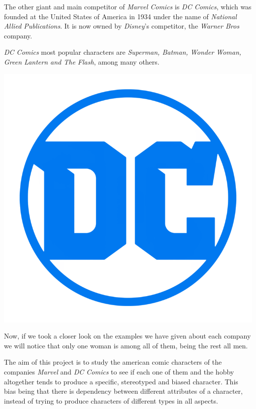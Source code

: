 \begin{minipage}{0.78\textwidth}%

The other giant and main competitor of \textit{Marvel Comics} is \textit{DC Comics}, which was founded at the United States of America in 1934 under the name of \textit{National Allied Publications}. It is now owned by \textit{Disney}'s competitor, the \textit{Warner Bros} company.

\textit{DC Comics} most popular characters are \textit{Superman, Batman, Wonder Woman, Green Lantern and The Flash}, among many others.  
\end{minipage}%
\begin{minipage}{0.02\textwidth}%
\hfill%

\end{minipage}
\begin{minipage}{0.2\textwidth}%
\includegraphics[width=\linewidth]{img/DC_Comics_logo.png}
\end{minipage}



Now, if we took a closer look on the examples we have given about each company we will notice that only one woman is among all of them, being the rest all men. 

The aim of this project is to study the american comic characters of the companies \textit{Marvel} and \textit{DC Comics} to see if each one of them and the hobby altogether tends to produce a specific, stereotyped and biased character. This bias being that there is dependency between different attributes of a character, instead of trying to produce characters of different types in all aspects.


